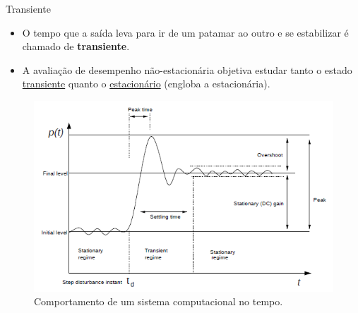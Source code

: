 \begin{frame}{Transiente}	
	\begin{itemize}
		\item O tempo que a saída leva para ir de um patamar ao outro e se estabilizar é chamado de \textbf{transiente}.  
		\item A avaliação de desempenho não-estacionária objetiva estudar tanto o estado \underline{transiente} quanto o \underline{estacionário} (engloba a estacionária).
	\end{itemize}
	\begin{figure}
		\centering
		\includegraphics[scale=.4]{images/dynamics.png}
		\caption{Comportamento de um sistema computacional no tempo.}
		\label{fig:respota-vs-tempo}
	\end{figure}	
\end{frame}


